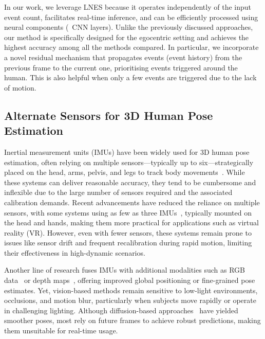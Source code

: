 In our work, we leverage LNES \citep{rudnev2021eventhands} because it operates independently of the input event count, facilitates real-time inference, and can be efficiently processed using neural components (\eg~CNN layers). 
%
Unlike the previously discussed approaches, our method is specifically designed for the egocentric setting and achieves the highest accuracy among all the methods compared.
%
In particular, we incorporate 
a novel residual %
mechanism that propagates events (event history) from the previous frame to the current one, prioritising events triggered around the human. 
This is also helpful 
when only a few events are triggered due to the lack of motion. 


\subsection{Alternate Sensors for 3D Human Pose Estimation} 
%
Inertial measurement units (IMUs) have been widely used for 3D human pose estimation, often relying on multiple sensors---typically up to six---strategically placed on the head, arms, pelvis, and legs to track body movements~\citep{von2017sparse,huang2018deep,yi2021transpose,jiang2022transformer,yi2022physical}.
%
While these systems can deliver reasonable accuracy, they tend to be cumbersome and inflexible due to the large number of sensors required and the associated calibration demands. 
%
Recent advancements have reduced the reliance on multiple sensors, with some systems using as few as three IMUs~\citep{aliakbarian2022flag,winkler2022questsim,jiang2022avatarposer,lee2023questenvsim,jiang2023egoposer,zheng2023realistic,jiang2025manikin}, typically mounted on the head and hands, making them more practical for applications such as virtual reality (VR). 
%
However, even with fewer sensors, these systems remain prone to issues like sensor drift and frequent recalibration during rapid motion, limiting their effectiveness in high-dynamic scenarios.


Another line of research fuses IMUs with additional modalities such as RGB data~\citep{gilbert2019fusing,von2016human,malleson2017real,guzov2021human,yi2023egolocate,dai2024hmd} or depth maps~\citep{helten2013real}, offering improved global positioning or fine-grained pose estimates. 
%
Yet, vision-based methods remain sensitive to low-light environments, occlusions, and motion blur, particularly when subjects move rapidly or operate in challenging lighting. 
%
Although diffusion-based approaches~\citep{du2023agrol,li2023ego,guzov2024hmd} have yielded smoother poses, most rely on future frames to achieve robust predictions, making them unsuitable for real-time usage. 
%


